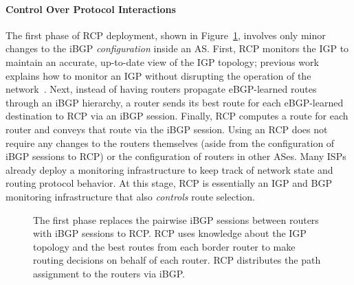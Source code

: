 
\paragraph{Control Over Protocol Interactions}\label{sec:feamster:fdna2004_ibgp}



The first phase of RCP deployment, shown in Figure~\ref{fig:ibgp_only},
involves only minor changes to the iBGP {\em configuration\/} inside
an AS.  
First, RCP monitors the IGP to
maintain an accurate, up-to-date view of the IGP topology; previous
work explains how to monitor an IGP without disrupting the operation
of the network~\cite{Shaikh2004}.
Next, instead of having routers propagate eBGP-learned routes through
an iBGP hierarchy, a router sends its best route for each eBGP-learned
destination to RCP via an
iBGP session.
Finally, RCP computes a route for each router and conveys that route via
the iBGP session. 
Using an RCP does not require any changes to the routers themselves
(aside from the configuration of iBGP sessions to RCP) or the
configuration of routers in other ASes.  Many ISPs already deploy a
monitoring infrastructure to keep track of network state and routing
protocol behavior.  At this stage, RCP is essentially an IGP and BGP monitoring
infrastructure that also {\em controls} route selection.


\begin{figure}
\centering{}
\caption[The first phase of RCP deployment]{The first phase replaces the
pairwise iBGP sessions between  
routers with iBGP sessions to RCP.  RCP uses knowledge about the
IGP topology and the best routes from each border router to
make routing decisions on behalf of each router.  RCP distributes the
path assignment to the routers via iBGP.}
\label{fig:ibgp_only}
\end{figure}


